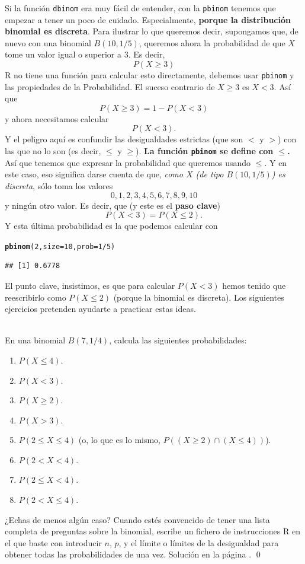 \documentclass[10pt,a4paper]{article}\usepackage[]{graphicx}\usepackage[]{color}
\makeatletter
\newcommand{\hlnum}[1]{\textcolor[rgb]{0.686,0.059,0.569}{#1}}%
\newcommand{\hlopt}[1]{\textcolor[rgb]{0,0,0}{#1}}%
\newcommand{\hlstd}[1]{\textcolor[rgb]{0.345,0.345,0.345}{#1}}%
\newcommand{\hlkwc}[1]{\textcolor[rgb]{0.333,0.667,0.333}{#1}}%
\newcommand{\hlkwd}[1]{\textcolor[rgb]{0.737,0.353,0.396}{\textbf{#1}}}%
\newenvironment{kframe}{%
 \def\at@end@of@kframe{}%
 \ifinner\ifhmode%
  \def\at@end@of@kframe{\end{minipage}}%
  \begin{minipage}{\columnwidth}%
 \fi\fi%
 \def\FrameCommand##1{\hskip\@totalleftmargin \hskip-\fboxsep
 \colorbox{shadecolor}{##1}\hskip-\fboxsep
     \hskip-\linewidth \hskip-\@totalleftmargin \hskip\columnwidth}%
 \MakeFramed {\advance\hsize-\width
   \@totalleftmargin\z@ \linewidth\hsize
   \@setminipage}}%
 {\par\unskip\endMakeFramed%
 \at@end@of@kframe}
\newenvironment{knitrout}{}{} %
\newcounter{cont01}
\makeatother
\begin{document}
Si la función {\tt dbinom} era muy fácil de entender, con la {\tt pbinom} tenemos que empezar a tener un poco de cuidado. Especialmente, {\bf porque la distribución binomial es discreta}. Para ilustrar lo que queremos decir, supongamos que, de nuevo con una binomial $B(10,1/5)$, queremos ahora la probabilidad de que $X$ tome un valor igual o superior a 3. Es decir,
\[P(X\geq 3)\]
R no tiene una función para calcular esto directamente, debemos usar {\tt pbinom} y las propiedades de la Probabilidad. El suceso contrario de $X\geq 3$ es $X<3$. Así que
\[P(X\geq 3)=1-P(X<3)\]
y ahora necesitamos calcular
\[P(X<3).\]
Y el peligro aquí es confundir las desigualdades estrictas (que son $<$ y $>$) con las que no lo son (es decir, $\leq$ y $\geq$). {\bf La función {\tt pbinom} se define con $\leq$.} Así que tenemos que expresar la probabilidad que queremos usando $\leq$. Y en este caso, eso significa darse cuenta de que, {\em como $X$ (de tipo $B(10,1/5)$) es discreta}, sólo toma los valores
\[0, 1, 2, 3, 4, 5, 6, 7, 8, 9, 10\]
y ningún otro valor. Es decir, que (y este es el {\bf paso clave})
\[P(X<3)=P(X\leq 2).\]
Y esta última probabilidad es la que podemos calcular con
\begin{knitrout}
\color{fgcolor}\begin{kframe}
\begin{alltt}
\hlkwd{pbinom}\hlstd{(}\hlnum{2}\hlstd{,} \hlkwc{size}\hlstd{=} \hlnum{10}\hlstd{,} \hlkwc{prob}\hlstd{=}\hlnum{1}\hlopt{/}\hlnum{5}\hlstd{)}
\end{alltt}
\begin{verbatim}
## [1] 0.6778
\end{verbatim}
\end{kframe}
\end{knitrout}
El punto clave, insistimos, es que para calcular $P(X<3)$ hemos tenido que reescribirlo como $P(X\leq 2)$ (porque la binomial es discreta). Los siguientes ejercicios pretenden ayudarte a practicar estas ideas.

\begin{ejercicio}
\label{tut05:ejercicio02}
\quad\\
En una binomial $B(7,1/4)$, calcula las siguientes probabilidades:
\begin{enumerate}
  \item $P(X\leq 4)$.
  \item $P(X<3)$.
  \item $P(X\geq 2)$.
  \item $P(X>3)$.
  \item $P(2\leq X \leq 4)$ (o, lo que es lo mismo, $P((X\geq 2)\cap (X\leq 4))$).
  \item $P(2<X<4)$.
  \item $P(2\leq X < 4)$.
  \item $P(2< X \leq 4)$.
\end{enumerate}
¿Echas de menos algún caso? Cuando estés convencido de tener una lista completa de preguntas sobre la binomial, escribe un fichero de instrucciones R en el que baste con introducir $n$, $p$, y el límite o límites de la desigualdad para obtener todas las probabilidades de una vez.
Solución en la página \pageref{tut05:ejercicio02:sol}.
\qed
\end{ejercicio}
\end{document}
